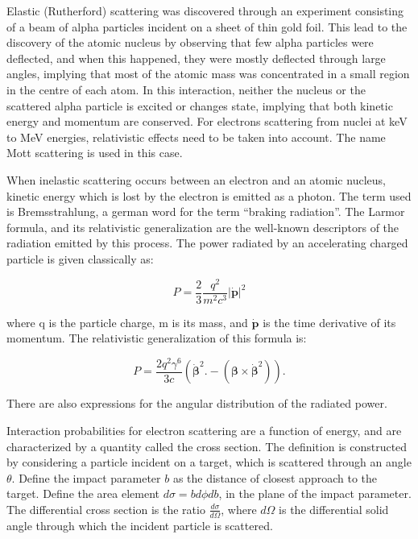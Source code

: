 Elastic (Rutherford) scattering was discovered through an experiment consisting of a  beam of alpha particles incident on a sheet of thin gold foil. This lead to the discovery of the atomic nucleus by observing that few alpha particles were deflected, and when this happened, they were mostly deflected through large angles, implying that most of the atomic mass was concentrated in a small region in the centre of each atom. In this interaction, neither the nucleus or the scattered alpha particle is excited or changes state, implying that both kinetic energy and momentum are conserved. For electrons scattering from nuclei at keV to MeV energies, relativistic effects need to be taken into account. The name Mott scattering is used in this case. 

When inelastic scattering occurs between an electron and an atomic nucleus, kinetic energy which is lost by the electron is emitted as a photon. The term used is Bremsstrahlung, a german word for the term ``braking radiation''. The Larmor formula, and its relativistic generalization are the well-known descriptors of the radiation emitted by this process. The power radiated by an accelerating charged particle is given classically as:

$$P = \frac{2}{3}\frac{q^2}{m^2c^3}\lvert \mathbf{\dot{p}} \rvert^2$$

where q is the particle charge, m is its mass, and $\mathbf{\dot{p}}$ is the time derivative of its momentum. The relativistic generalization of this formula is:

$$P = \frac{2 q^2 \gamma^6}{3c} \left( \dot{\mathbf{\beta}}^2.- (\mathbf{\beta}\times\mathbf{\dot{\mathbf{\beta}}}^2)\right).$$

There are also expressions for the angular distribution of the radiated power. 

Interaction probabilities for electron scattering are a function of energy, and are characterized by a quantity called the cross section. The definition is constructed by considering a particle incident on a target, which is scattered through an angle $\theta$. Define the impact parameter $b$ as the distance of closest approach to the target. Define the area element $d\sigma = b d\phi db$, in the plane of the impact parameter. The differential cross section is the ratio $\frac{d\sigma}{d\Omega}$, where $d\Omega$ is the differential solid angle through which the incident particle is scattered. 

